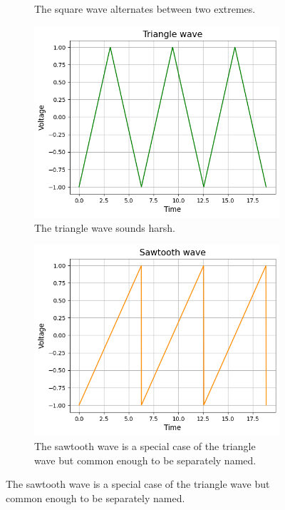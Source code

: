 \documentclass{article}
\begin{document}
\begin{figure}[h!]
\begin{subfigure}[t]{0.45\textwidth}
            \caption{The square wave alternates between two extremes.}
            \label{fig:square}
        \end{subfigure}       
        \newline
        \begin{subfigure}[t]{0.45\textwidth}
            \includegraphics[width=\textwidth]{waves/tri.png}
            \caption{The triangle wave sounds harsh.}
            \label{fig:tri}
        \end{subfigure}
        \hfill
        \begin{subfigure}[t]{0.45\textwidth}
            \includegraphics[width=\textwidth]{waves/saw.png}
            \caption{The sawtooth wave is a special case of the triangle wave but common enough to be separately named.}
            \label{fig:saw}
        \end{subfigure}       
    \end{figure}
\end{document}
